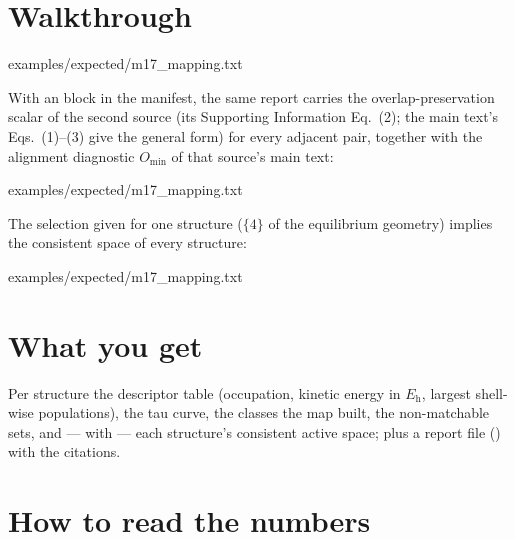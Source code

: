\section{Walkthrough}


  {examples/expected/m17_mapping.txt}

With an  block in the manifest, the same report carries the
overlap-preservation scalar of the second source (its Supporting Information
Eq.~(2); the main text's Eqs.~(1)--(3) give the general form) for every
adjacent pair, together with the alignment diagnostic $O_{\min}$ of that
source's main text:


  {examples/expected/m17_mapping.txt}

The selection given for one structure ($\{4\}$ of the equilibrium geometry)
implies the consistent space of every structure:


  {examples/expected/m17_mapping.txt}

\section{What you get}

Per structure the descriptor table (occupation, kinetic energy in $E_\mathrm{h}$,
largest shell-wise populations), the tau curve, the classes the map built, the
non-matchable sets, and --- with  --- each structure's
consistent active space; plus a report file
() with the citations.

\section{How to read the numbers}


